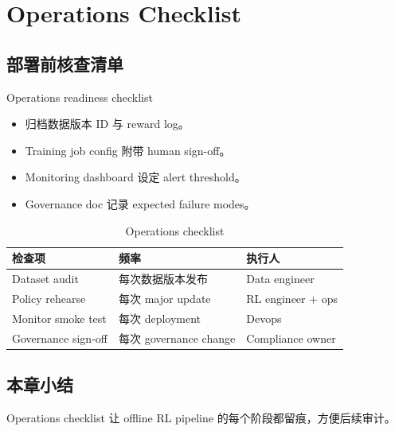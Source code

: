 \section{Operations Checklist}

\subsection{部署前核查清单}

\begin{knowledgebox}{Operations readiness checklist}
\begin{itemize}
    \item 归档数据版本 ID 与 reward log。
    \item Training job config 附带 human sign-off。
    \item Monitoring dashboard 设定 alert threshold。
    \item Governance doc 记录 expected failure modes。
\end{itemize}
\end{knowledgebox}

\begin{table}[H]
\centering
\begin{tabular}{p{} p{} p{}}
\toprule
检查项 & 频率 & 执行人 \\
\midrule
Dataset audit & 每次数据版本发布 & Data engineer \\
Policy rehearse & 每次 major update & RL engineer + ops \\
Monitor smoke test & 每次 deployment & Devops \\
Governance sign-off & 每次 governance change & Compliance owner \\
\bottomrule
\end{tabular}
\caption{Operations checklist}
\end{table}

\subsection{本章小结}

Operations checklist 让 offline RL pipeline 的每个阶段都留痕，方便后续审计。

